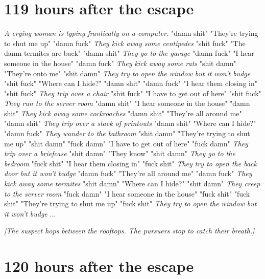 \documentclass{report}
\begin{document}
\section*{119 \small{hours after the escape}}

\textit{A crying woman is typing frantically on a computer.} "damn shit" "They're trying to shut me up" "damn fuck" \textit{They kick away some centipedes} "shit fuck" "The damn termites are back" "damn shit" \textit{They go to the garage} "damn fuck" "I hear someone in the house" "damn fuck" \textit{They kick away some rats} "shit damn" "They're onto me" "shit damn" \textit{They try to open the window but it won't budge} "shit fuck" "Where can I hide?" "damn shit" \textit{} "damn fuck" "I hear them closing in" "shit fuck" \textit{They trip over a chair} "shit fuck" "I have to get out of here" "shit fuck" \textit{They run to the server room} "damn shit" "I hear someone in the house" "damn shit" \textit{They kick away some cockroaches} "damn shit" "They're all around me" "damn shit" \textit{They trip over a stack of printouts} "damn shit" "Where can I hide?" "damn fuck" \textit{They wander to the bathroom} "shit damn" "They're trying to shut me up" "shit damn" \textit{} "fuck damn" "I have to get out of here" "fuck damn" \textit{They trip over a briefcase} "shit damn" "They know" "shit damn" \textit{They go to the bedroom} "fuck shit" "I hear them closing in" "fuck shit" \textit{They try to open the back door but it won't budge} "damn fuck" "They're all around me" "damn fuck" \textit{They kick away some termites} "shit damn" "Where can I hide?" "shit damn" \textit{They creep to the server room} "fuck damn" "I hear someone in the house" "fuck shit" \textit{} "fuck shit" "They're trying to shut me up" "fuck shit" \textit{They try to open the window but it won't budge} \textit{}...

\textit{[The suspect hops between the rooftops. The pursuers stop to catch their breath.]}


\section*{120 \small{hours after the escape}}
\end{document}
